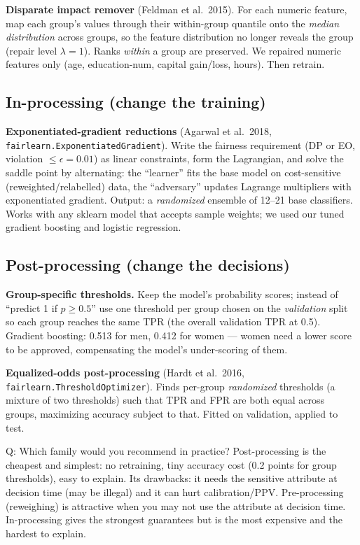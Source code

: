 \documentclass[11pt,a4paper]{article}
\begin{document}
\textbf{Disparate impact remover} (Feldman et al.\ 2015). For each numeric feature, map each group's values through their within-group quantile onto the \emph{median distribution} across groups, so the feature distribution no longer reveals the group (repair level $\lambda=1$). Ranks \emph{within} a group are preserved. We repaired numeric features only (age, education-num, capital gain/loss, hours). Then retrain.

\subsection{In-processing (change the training)}
\textbf{Exponentiated-gradient reductions} (Agarwal et al.\ 2018, \texttt{fairlearn.ExponentiatedGradient}). Write the fairness requirement (DP or EO, violation $\leq\epsilon=0.01$) as linear constraints, form the Lagrangian, and solve the saddle point by alternating: the ``learner'' fits the base model on cost-sensitive (reweighted/relabelled) data, the ``adversary'' updates Lagrange multipliers with exponentiated gradient. Output: a \emph{randomized} ensemble of 12--21 base classifiers. Works with any sklearn model that accepts sample weights; we used our tuned gradient boosting and logistic regression.

\subsection{Post-processing (change the decisions)}
\textbf{Group-specific thresholds.} Keep the model's probability scores; instead of ``predict 1 if $p\geq0.5$'' use one threshold per group chosen on the \emph{validation} split so each group reaches the same TPR (the overall validation TPR at 0.5). Gradient boosting: 0.513 for men, 0.412 for women --- women need a lower score to be approved, compensating the model's under-scoring of them.

\textbf{Equalized-odds post-processing} (Hardt et al.\ 2016, \texttt{fairlearn.ThresholdOptimizer}). Finds per-group \emph{randomized} thresholds (a mixture of two thresholds) such that TPR and FPR are both equal across groups, maximizing accuracy subject to that. Fitted on validation, applied to test.

\begin{qa}{Q: Which family would you recommend in practice?}
Post-processing is the cheapest and simplest: no retraining, tiny accuracy cost (0.2 points for group thresholds), easy to explain. Its drawbacks: it needs the sensitive attribute at decision time (may be illegal) and it can hurt calibration/PPV. Pre-processing (reweighing) is attractive when you may not use the attribute at decision time. In-processing gives the strongest guarantees but is the most expensive and the hardest to explain.
\end{qa}
\end{document}
